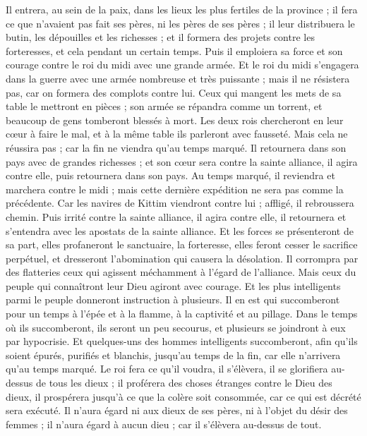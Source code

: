 \begin{multicols}{2}
Il entrera, au sein de la paix, dans les lieux les plus fertiles de la province ; il fera ce que n’avaient pas fait ses pères, ni les pères de ses pères ; il leur distribuera le butin, les dépouilles et les richesses ; et il formera des projets contre les forteresses, et cela pendant un certain temps.
Puis il emploiera sa force et son courage contre le roi du midi avec une grande armée. Et le roi du midi s’engagera dans la guerre avec une armée nombreuse et très puissante ; mais il ne résistera pas, car on formera des complots contre lui.
Ceux qui mangent les mets de sa table le mettront en pièces ; son armée se répandra comme un torrent, et beaucoup de gens tomberont blessés à mort.
Les deux rois chercheront en leur cœur à faire le mal, et à la même table ils parleront avec fausseté. Mais cela ne réussira pas ; car la fin ne viendra qu’au temps marqué.
Il retournera dans son pays avec de grandes richesses ; et son cœur sera contre la sainte alliance, il agira contre elle, puis retournera dans son pays.
Au temps marqué, il reviendra et marchera contre le midi ; mais cette dernière expédition ne sera pas comme la précédente.
Car les navires de Kittim viendront contre lui ; affligé, il rebroussera chemin. Puis irrité contre la sainte alliance, il agira contre elle, il retournera et s'entendra avec les apostats de la sainte alliance.
Et les forces se présenteront de sa part, elles profaneront le sanctuaire, la forteresse, elles feront cesser le sacrifice perpétuel, et dresseront l'abomination qui causera la désolation.
Il corrompra par des flatteries ceux qui agissent méchamment à l’égard de l'alliance. Mais ceux du peuple qui connaîtront leur Dieu agiront avec courage.
Et les plus intelligents parmi le peuple donneront instruction à plusieurs. Il en est qui succomberont pour un temps à l'épée et à la flamme, à la captivité et au pillage.
Dans le temps où ils  succomberont, ils seront un peu secourus, et plusieurs se joindront à eux par hypocrisie.
Et quelques-uns des hommes intelligents succomberont, afin qu’ils soient épurés, purifiés et blanchis, jusqu'au temps de la fin, car elle n’arrivera qu’au temps marqué.
Le roi fera ce qu’il voudra, il s’élèvera, il se glorifiera au-dessus de tous les dieux ; il proférera des choses étranges contre le Dieu des dieux, il prospérera jusqu'à ce que la colère soit consommée,  car ce qui est décrété sera exécuté.
Il n’aura égard ni aux dieux de ses pères, ni à l’objet du désir des femmes ; il n’aura égard à aucun dieu ; car il s'élèvera au-dessus de tout.

\end{multicols}
